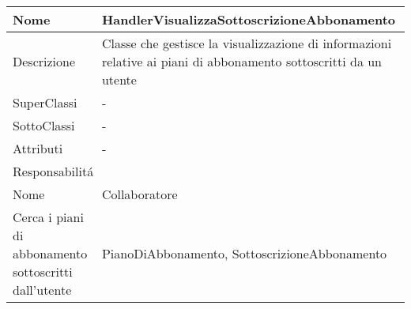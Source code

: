 \begin{center}
    \begin{longtable}{ |p{3cm}|p{3cm}|p{3cm}|p{3cm}| }
        \hline
        Nome & \multicolumn{3}{|p{9cm}|}{HandlerVisualizzaSottoscrizioneAbbonamento} \\\hline
        Descrizione & \multicolumn{3}{|p{9cm}|}{Classe che gestisce la visualizzazione  di informazioni relative ai piani di abbonamento sottoscritti da un utente} \\\hline
        SuperClassi & \multicolumn{3}{|p{9cm}|}{-} \\\hline
        SottoClassi & \multicolumn{3}{|p{9cm}|}{-} \\\hline
        Attributi & \multicolumn{3}{|p{9cm}|}{-} \\\hline
        \multicolumn{4}{|p{12cm}|}{Responsabilit\'a} \\\hline
        \multicolumn{2}{|p{6cm}|}{Nome} & \multicolumn{2}{|p{6cm}|}{Collaboratore} \\\hline
        \multicolumn{2}{|p{6cm}|}{Cerca i piani di abbonamento sottoscritti dall'utente} & \multicolumn{2}{|p{6cm}|}{PianoDiAbbonamento, SottoscrizioneAbbonamento} \\\hline
    \end{longtable}
\end{center}

